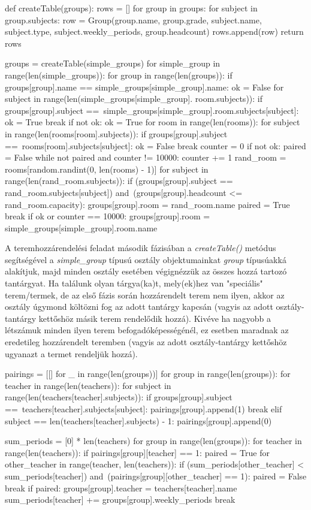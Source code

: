 \begin{python}
	def createTable(groups):
	rows = []
	for group in groups:
	for subject in group.subjects:
	row = Group(group.name, group.grade, subject.name,
	subject.type, subject.weekly_periods, group.headcount)
	rows.append(row)
	return rows
	
	
	groups = createTable(simple_groups)
	for simple_group in range(len(simple_groups)):
	for group in range(len(groups)):
	if groups[group].name == simple_groups[simple_group].name:
	ok = False
	for subject in range(len(simple_groups[simple_group].
	room.subjects)):
	if groups[group].subject ==\
	simple_groups[simple_group].room.subjects[subject]:
	ok = True
	break
	if not ok:
	ok = True
	for room in range(len(rooms)):
	for subject in range(len(rooms[room].subjects)):
	if groups[group].subject ==\
	rooms[room].subjects[subject]:
	ok = False
	break
	counter = 0
	if not ok:
	paired = False
	while not paired and counter != 10000:
	counter += 1
	rand_room = rooms[random.randint(0, len(rooms) - 1)]
	for subject in range(len(rand_room.subjects)):
	if (groups[group].subject ==
	rand_room.subjects[subject]) and\
	(groups[group].headcount <= 
	rand_room.capacity):
	groups[group].room = rand_room.name
	paired = True
	break
	if ok or counter == 10000:
	groups[group].room = simple_groups[simple_group].room.name
\end{python}

A teremhozzárendelési feladat második fázisában a \textit{createTable()} metódus segítségével a \textit{simple\_group} típusú osztály objektumainkat \textit{group} típusúakká alakítjuk, majd minden osztály esetében végignézzük az összes hozzá tartozó tantárgyat. Ha találunk olyan tárgya(ka)t, mely(ek)hez van "speciális" terem/termek, de az első fázis során hozzárendelt terem nem ilyen, akkor az osztály úgymond költözni fog az adott tantárgy kapcsán (vagyis az adott osztály-tantárgy kettőshöz másik terem rendelődik hozzá). Kivéve ha nagyobb a létszámuk minden ilyen terem befogadóképességénél, ez esetben maradnak az eredetileg hozzárendelt teremben (vagyis az adott osztály-tantárgy kettőshöz ugyanazt a termet rendeljük hozzá).


\begin{python}
	pairings = [[] for _ in range(len(groups))]
	for group in range(len(groups)):
	for teacher in range(len(teachers)):
	for subject in range(len(teachers[teacher].subjects)):
	if groups[group].subject ==\
	teachers[teacher].subjects[subject]:
	pairings[group].append(1)
	break
	elif subject == len(teachers[teacher].subjects) - 1:
	pairings[group].append(0)
	
	sum_periods = [0] * len(teachers)
	for group in range(len(groups)):
	for teacher in range(len(teachers)):
	if pairings[group][teacher] == 1:
	paired = True
	for other_teacher in range(teacher, len(teachers)):
	if (sum_periods[other_teacher] < 
	sum_periods[teacher]) and\
	(pairings[group][other_teacher] == 1):
	paired = False
	break
	if paired:
	groups[group].teacher = teachers[teacher].name
	sum_periods[teacher] += groups[group].weekly_periods
	break
\end{python}

